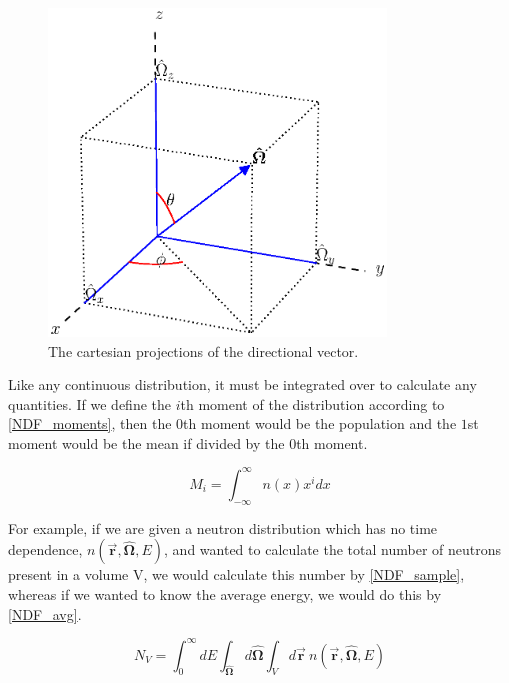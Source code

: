 \begin{figure}[h!] 
  \centering
    \includegraphics[width=0.8\textwidth , trim= 0cm 2.5cm 0cm 0cm]{graphics/ang_relation.eps} %
     \caption{The cartesian projections of the directional vector. \label{ang_relations}}
\end{figure}

Like any continuous distribution, it must be integrated over to calculate any quantities.  If we define the $i$th moment of the distribution according to \eqref{NDF_moments}, then the $0$th moment would be the population and the $1$st moment would be the mean if divided by the $0$th moment.

\begin{equation}
\label{NDF_moments}
M_i = \int_{-\infty}^{\infty} n(x)  x^{i} dx
\end{equation}

For example, if we are given a neutron distribution which has no time dependence, $n(\boldsymbol{\vec{r}},\boldsymbol{\hat{\Omega}},E)$, and wanted to calculate the total number of neutrons present in a volume V, we would calculate this number by \eqref{NDF_sample}, whereas if we wanted to know the average energy, we would do this by \eqref{NDF_avg}.

\begin{equation}
\label{NDF_sample}
N_V = \int_0^\infty dE \int_{\boldsymbol{\hat{\Omega}}} d\boldsymbol{\hat{\Omega}}  \int_{V} d\boldsymbol{\vec{r}} \: n(\boldsymbol{\vec{r}},\boldsymbol{\hat{\Omega}},E)  
\end{equation}

